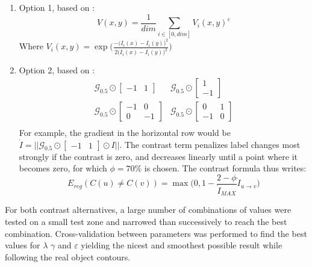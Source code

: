 \documentclass[10pt]{article}
\begin{document}
\begin{enumerate}
    \item Option 1, based on \cite{ouerghemmi_two-step_2017}: 
    \begin{equation}
        V(x,y)=\frac{1}{dim}\sum_{i\in[0,dim]}V_i(x,y)^\varepsilon
    \end{equation}
    Where $V_i(x,y)=\exp\Bigg(\frac{-\big(I_i(x)-I_i(y)\big)^2}{2\big(\overline{I_i(x)-I_i(y)}\big)^2}\Bigg)$
    \item Option 2, based on \cite{schindler_overview_2012}:
    \begin{equation}
        \begin{aligned}
            &\mathcal{G}_{0.5}\odot
            \begin{bmatrix}
            -1 &1
            \end{bmatrix}& \mathcal{G}_{0.5}\odot
            \begin{bmatrix}
            1 \\
            -1
            \end{bmatrix}&\\
            &\mathcal{G}_{0.5}\odot
            \begin{bmatrix}
            -1 & 0 \\
            0 &-1
            \end{bmatrix}&\mathcal{G}_{0.5}\odot
            \begin{bmatrix}
            0& 1 \\
            -1 &0
            \end{bmatrix}&\\
        \end{aligned}
    \end{equation}
    For example, the gradient in the horizontal row would be $\dot{I}=||\mathcal{G}_{0.5}\odot\begin{bmatrix}-1 &1\end{bmatrix}\odot I||$. The contrast term penalizes label changes most strongly if the contrast is zero, and decreases linearly until a point where it becomes zero, for which $\phi=70\%$ is chosen. The contrast formula thus writes:
    \begin{equation}
        E_{reg}(C(u)\neq C(v))=\max\Big(0,1-\frac{2-\phi}{\dot{I}_{MAX}}\dot{I}_{u\rightarrow v}\Big)
    \end{equation}
\end{enumerate}
For both contrast alternatives, a large number of combinations of values were tested on a small test zone and narrowed than successively to reach the best combination. Cross-validation between parameters was performed to find the best values for $\lambda$ $\gamma$ and $\varepsilon$ yielding the nicest and smoothest possible result while following the real object contours.\\
\end{document}
